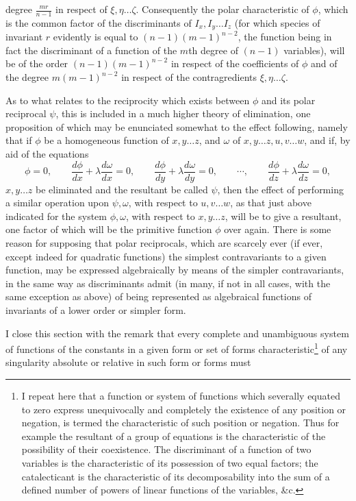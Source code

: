 \documentclass[11pt]{article}
\newcommand{\sourcepage}[1]{\marginpar{\scriptsize p.~#1}}
\begin{document}
{{\sourcepage{304}
degree $\frac{mr}{n-1}$ in respect of $\xi,\eta\ldots\zeta$. Consequently the polar characteristic of $\phi$, which is the common factor of the discriminants of $I_x,I_y\ldots I_z$ (for which species of invariant $r$ evidently is equal to $(n-1)(m-1)^{n-2}$, the function being in fact the discriminant of a function of the $m$th degree of $(n-1)$ variables), will be of the order $(n-1)(m-1)^{n-2}$ in respect of the coefficients of $\phi$ and of the degree $m(m-1)^{n-2}$ in respect of the contragredients $\xi,\eta\ldots\zeta$.

As to what relates to the reciprocity which exists between $\phi$ and its polar reciprocal $\psi$, this is included in a much higher theory of elimination, one proposition of which may be enunciated somewhat to the effect following, namely that if $\phi$ be a homogeneous function of $x,y\ldots z$, and $\omega$ of $x,y\ldots z,u,v\ldots w$, and if, by aid of the equations
\[
\phi=0,
\qquad
\frac{d\phi}{dx}+\lambda\frac{d\omega}{dx}=0,
\qquad
\frac{d\phi}{dy}+\lambda\frac{d\omega}{dy}=0,
\qquad \cdots,
\qquad
\frac{d\phi}{dz}+\lambda\frac{d\omega}{dz}=0,
\]
$x,y\ldots z$ be eliminated and the resultant be called $\psi$, then the effect of performing a similar operation upon $\psi,\omega$, with respect to $u,v\ldots w$, as that just above indicated for the system $\phi,\omega$, with respect to $x,y\ldots z$, will be to give a resultant, one factor of which will be the primitive function $\phi$ over again. There is some reason for supposing that polar reciprocals, which are scarcely ever (if ever, except indeed for quadratic functions) the simplest contravariants to a given function, may be expressed algebraically by means of the simpler contravariants, in the same way as discriminants admit (in many, if not in all cases, with the same exception as above) of being represented as algebraical functions of invariants of a lower order or simpler form.

I close this section with the remark that every complete and unambiguous system of functions of the constants in a given form or set of forms characteristic\footnote{I repeat here that a function or system of functions which severally equated to zero express unequivocally and completely the existence of any position or negation, is termed the characteristic of such position or negation. Thus for example the resultant of a group of equations is the characteristic of the possibility of their coexistence. The discriminant of a function of two variables is the characteristic of its possession of two equal factors; the catalecticant is the characteristic of its decomposability into the sum of a defined number of powers of linear functions of the variables, \&c.} of any singularity absolute or relative in such form or forms must

}}
\end{document}

